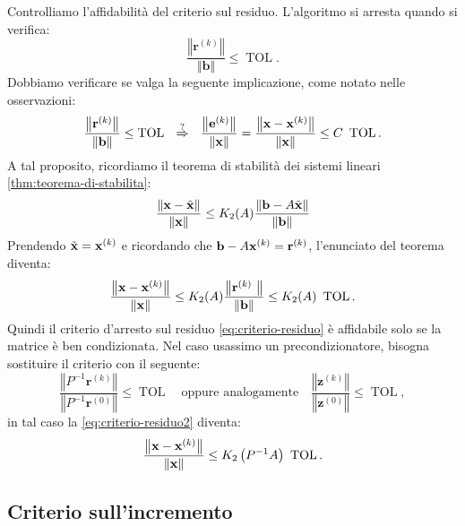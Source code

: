 Controlliamo l'affidabilità del criterio sul residuo. L'algoritmo si arresta quando si verifica:
\begin{equation}
\frac{\left\Vert \mathbf{r}^{(k)}\right\Vert }{\Vert \mathbf{b}\Vert } \leqslant \operatorname{TOL}.
\label{eq:criterio-residuo}
\end{equation}
Dobbiamo verificare se valga la seguente implicazione, come notato nelle osservazioni:
\begin{equation*}
\frac{\left\Vert \mathbf{r}^{(k)}\right\Vert }{\Vert \mathbf{b}\Vert } \leqslant \operatorname{TOL} \ \ \overset{?}{\Rightarrow } \ \ \frac{\left\Vert \mathbf{e}^{(k)}\right\Vert }{\Vert \x\Vert } =\frac{\left\Vert \x -\x^{(k)}\right\Vert }{\Vert \x\Vert } \leqslant C\ \operatorname{TOL}.
\end{equation*}
A tal proposito, ricordiamo il teorema di stabilità dei sistemi lineari \ref{thm:teorema-di-stabilita}:
\begin{equation*}
\frac{\left\Vert \mathbf{x} -\tilde{\mathbf{x}}\right\Vert }{\Vert \mathbf{x}\Vert } \leq K_{2}(A)\frac{\left\Vert \mathbf{b} -A\tilde{\mathbf{x}}\right\Vert }{\Vert \mathbf{b}\Vert }
\end{equation*}
Prendendo $\tilde{\mathbf{x}} =\mathbf{x}^{(k)}$ e ricordando che $\mathbf{b} -A\mathbf{x}^{(k)} =\mathbf{r}^{(k)}$, l'enunciato del teorema diventa:
\begin{equation}
\frac{\left\Vert \x -\x^{(k)}\right\Vert }{\Vert \x\Vert } \leqslant K_{2}(A)\frac{\left\Vert \mathbf{r}^{(k)} \ \right\Vert }{\Vert \mathbf{b}\Vert } \leqslant K_{2}(A) \ \operatorname{TOL}.
\label{eq:criterio-residuo2}
\end{equation}
Quindi il criterio d'arresto sul residuo \eqref{eq:criterio-residuo} è affidabile solo se la matrice è ben condizionata. Nel caso usassimo un precondizionatore, bisogna sostituire il criterio con il seguente:
\begin{equation*}
\frac{\left\Vert P^{-1}\mathbf{r}^{(k)}\right\Vert }{\left\Vert P^{-1}\mathbf{r}^{(0)}\right\Vert } \leqslant \operatorname{TOL} \quad \text{oppure analogamente} \quad \frac{\left\Vert \mathbf{z}^{(k)}\right\Vert }{\left\Vert \mathbf{z}^{(0)}\right\Vert } \leqslant \operatorname{TOL},
\end{equation*}
in tal caso la \eqref{eq:criterio-residuo2} diventa:
\begin{equation*}
\frac{\left\Vert \mathbf{x} -\mathbf{x}^{(k)}\right\Vert }{\Vert \mathbf{x}\Vert } \leq K_{2}\left( P^{-1} A\right) \ \operatorname{TOL}.
\end{equation*}
\subsection{Criterio sull'incremento}

